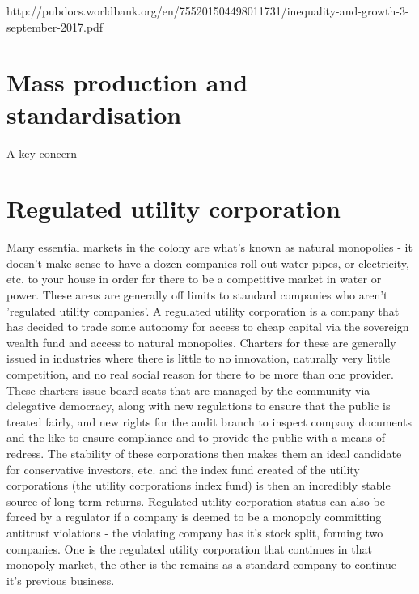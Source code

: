 \documentclass[10pt]{article}
\begin{document}
http://pubdocs.worldbank.org/en/755201504498011731/inequality-and-growth-3-september-2017.pdf

\section{Mass production and standardisation}
A key concern

\section{Regulated utility corporation}
Many essential markets in the colony are what's known as natural monopolies - it doesn't make sense to have a dozen companies roll out water pipes, or electricity, etc. to your house in order for there to be a competitive market in water or power. These areas are generally off limits to standard companies who aren't 'regulated utility companies'. A regulated utility corporation is a company that has decided to trade some autonomy for access to cheap capital via the sovereign wealth fund and access to natural monopolies. Charters for these are generally issued in industries where there is little to no innovation, naturally very little competition, and no real social reason for there to be more than one provider. These charters issue board seats that are managed by the community via delegative democracy, along with new regulations to ensure that the public is treated fairly, and new rights for the audit branch to inspect company documents and the like to ensure compliance and to provide the public with a means of redress. The stability of these corporations then makes them an ideal candidate for conservative investors, etc. and the index fund created of the utility corporations (the utility corporations index fund) is then an incredibly stable source of long term returns. Regulated utility corporation status can also be forced by a regulator if a company is deemed to be a monopoly committing antitrust violations - the violating company has it's stock split, forming two companies. One is the regulated utility corporation that continues in that monopoly market, the other is the remains as a standard company to continue it's previous business.
\end{document}
